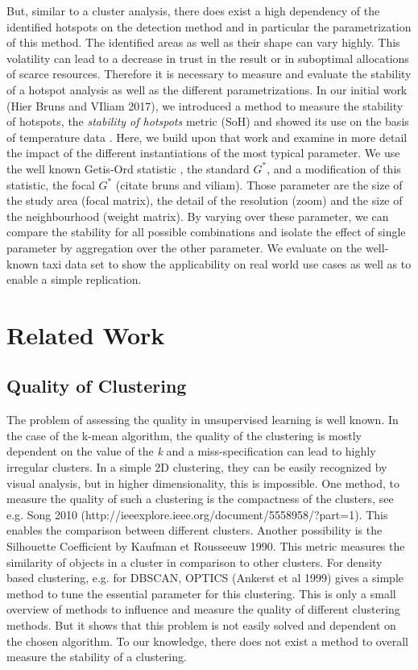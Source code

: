 \documentclass{itatnew}
\begin{document}
But, similar to a cluster analysis, there does exist a high dependency of the identified hotspots on the detection method and in particular the parametrization of this method. The identified areas as well as their shape can vary highly. This volatility can lead to a decrease in trust in the result or in suboptimal allocations of scarce resources. Therefore it is necessary to measure and evaluate the stability of a hotspot analysis as well as the different parametrizations. 
In our initial work (Hier Bruns and VIliam 2017), we introduced a method to measure the stability of hotspots, the \emph{stability of hotspots} metric (SoH) and showed its use on the basis of temperature data .   
Here, we build upon that work and examine in more detail the impact of the different instantiations of the most typical parameter. We use the well known Getis-Ord statistic \cite{Ord.1995}, the standard $G^*$, and a modification of this statistic, the focal $G^*$ (citate bruns and viliam). Those parameter are the size of the study area (focal matrix), the detail of the resolution (zoom) and the size of the neighbourhood (weight matrix). By varying over these parameter, we can compare the stability for all possible combinations and isolate the effect of single parameter by aggregation over the other parameter. 
We evaluate on the well-known taxi data set to show the applicability on real world use cases as well as to enable a simple replication. 


\section{Related Work}

\subsection{Quality of Clustering}
The problem of assessing the quality in unsupervised learning is well known. In the case of the k-mean algorithm, the quality of the clustering is mostly dependent on the value of the \emph{k} and a miss-specification can lead to highly irregular clusters. In a simple 2D clustering, they can be easily recognized by visual analysis, but in higher dimensionality, this is impossible. One method, to measure the quality of such a clustering is the compactness of the clusters, see e.g. Song 2010 (http://ieeexplore.ieee.org/document/5558958/?part=1). This enables the comparison between different clusters. Another possibility is the Silhouette Coefficient by Kaufman et Rousseeuw 1990. This metric measures the similarity of objects in a cluster in comparison to other clusters. For density based clustering, e.g. for DBSCAN, OPTICS (Ankerst et al 1999) gives a simple method to tune the essential parameter for this clustering. This is only a small overview of methods to influence and measure the quality of different clustering methods. But it shows that this problem is not easily solved and dependent on the chosen algorithm. To our knowledge, there does not exist a method to overall measure the stability of a clustering.
\end{document}
